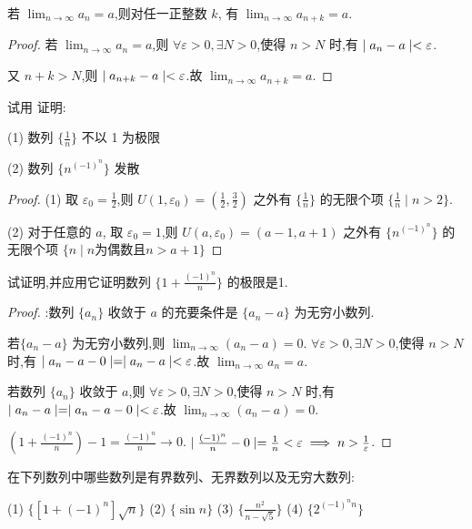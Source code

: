 \begin{practice}
    若 $\lim_{n\to\infty} a_n=a$,则对任一正整数 $k$, 有 $\lim_{n\to\infty} a_{n+k}=a$.
\end{practice}

\begin{proof}
    若 $\lim_{n\to\infty} a_n=a$,则 $\forall \varepsilon>0,\exists N>0$,使得 $n>N$ 时,有 $\mid a_n-a \mid<\varepsilon$. 
    
    又 $n+k>N$,则 $\mid a_{n+k}-a \mid<\varepsilon$.故 $\lim_{n\to\infty} a_{n+k}=a$.
\end{proof}

\begin{practice}
    试用 证明:

    (1) 数列 $\{\frac{1}{n}\}$ 不以 1 为极限

    (2) 数列 $\{n^{(-1)^n}\}$ 发散
\end{practice}

\begin{proof}
    (1) 取 $\varepsilon_0=\frac{1}{2}$,则 $U(1,\varepsilon_0)=(\frac{1}{2},\frac{3}{2})$ 之外有 $\{\frac{1}{n}\}$ 的无限个项 $\{\frac{1}{n}\mid n>2\}$.

    (2) 对于任意的 $a$, 取 $\varepsilon_0=1$,则 $U(a,\varepsilon_0)=(a-1,a+1)$ 之外有 $\{n^{(-1)^n}\}$ 的无限个项 $\{n\mid n\text{为偶数且}n>a+1\}$
\end{proof}

\begin{practice}
     试证明,并应用它证明数列 $\{1+\frac{(-1)^n}{n}\}$ 的极限是1.
\end{practice}

\begin{proof}
    :数列 $\{a_n\}$ 收敛于 $a$ 的充要条件是 $\{a_n-a\}$ 为无穷小数列.

    \chongfen 若$\{a_n-a\}$ 为无穷小数列,则 $\lim_{n\to\infty} (a_n-a)=0$. $\forall \varepsilon>0,\exists N>0$,使得 $n>N$ 时,有 $\mid a_n-a-0 \mid=\mid a_n-a \mid<\varepsilon$.故 $\lim_{n\to\infty} a_n=a$.

    \biyao 若数列 $\{a_n\}$ 收敛于 $a$,则 $\forall \varepsilon>0,\exists N>0$,使得 $n>N$ 时,有 $\mid a_n-a \mid=\mid a_n-a-0 \mid<\varepsilon$.故 $\lim_{n\to\infty}(a_n-a)=0$.

    $(1+\frac{(-1)^n}{n})-1=\frac{(-1)^n}{n}\to 0$. $\mid \frac{(-1)^n}{n}-0 \mid=\frac{1}{n}<\varepsilon \implies n>\frac{1}{\varepsilon}$.
\end{proof}

\begin{practice}
    在下列数列中哪些数列是有界数列、无界数列以及无穷大数列:

    (1) $\{[1+(-1)^n]\sqrt{n}\}$ \quad (2) $\{\sin n\}$ \quad (3) $\{\frac{n^2}{n-\sqrt{5}}\}$ \quad (4) $\{2^{(-1)^nn}\}$
\end{practice}

